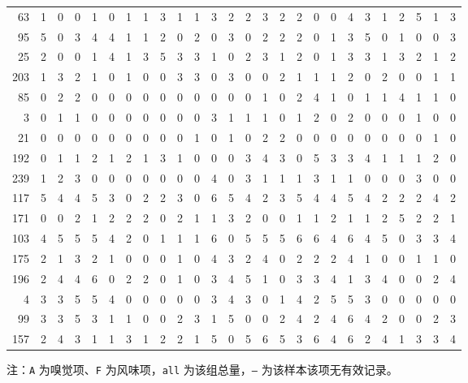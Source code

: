 \begin{longtable}{@{\extracolsep{\fill}}rccccccccccccccccccccccccc@{}}
63 & 1 & 0 & 0 & 1 & 0 & 1 & 1 & 3 & 1 & 1 & 3 & 2 & 2 & 3 & 2 & 2 & 0 & 0 & 4 & 3 & 1 & 2 & 5 & 1 & 3 \\
95 & 5 & 0 & 3 & 4 & 4 & 1 & 1 & 2 & 0 & 2 & 0 & 3 & 0 & 2 & 2 & 2 & 0 & 1 & 3 & 5 & 0 & 1 & 0 & 0 & 3 \\
25 & 2 & 0 & 0 & 1 & 4 & 1 & 3 & 5 & 3 & 3 & 1 & 0 & 2 & 3 & 1 & 2 & 0 & 1 & 3 & 3 & 1 & 3 & 2 & 1 & 2 \\
203 & 1 & 3 & 2 & 1 & 0 & 1 & 0 & 0 & 3 & 3 & 0 & 3 & 0 & 0 & 2 & 1 & 1 & 1 & 2 & 0 & 2 & 0 & 0 & 1 & 1 \\
85 & 0 & 2 & 2 & 0 & 0 & 0 & 0 & 0 & 0 & 0 & 0 & 0 & 0 & 1 & 0 & 2 & 4 & 1 & 0 & 1 & 1 & 4 & 1 & 1 & 0 \\
3 & 0 & 1 & 1 & 0 & 0 & 0 & 0 & 0 & 0 & 0 & 3 & 1 & 1 & 1 & 0 & 1 & 2 & 0 & 2 & 0 & 0 & 0 & 1 & 0 & 0 \\
21 & 0 & 0 & 0 & 0 & 0 & 0 & 0 & 0 & 0 & 1 & 0 & 1 & 0 & 2 & 2 & 0 & 0 & 0 & 0 & 0 & 0 & 0 & 0 & 1 & 0 \\
192 & 0 & 1 & 1 & 2 & 1 & 2 & 1 & 3 & 1 & 0 & 0 & 0 & 3 & 4 & 3 & 0 & 5 & 3 & 3 & 4 & 1 & 1 & 1 & 2 & 0 \\
239 & 1 & 2 & 3 & 0 & 0 & 0 & 0 & 0 & 0 & 0 & 4 & 0 & 3 & 1 & 1 & 1 & 3 & 1 & 1 & 0 & 0 & 0 & 3 & 0 & 0 \\
117 & 5 & 4 & 4 & 5 & 3 & 0 & 2 & 2 & 3 & 0 & 6 & 5 & 4 & 2 & 3 & 5 & 4 & 4 & 5 & 4 & 2 & 2 & 2 & 4 & 2 \\
171 & 0 & 0 & 2 & 1 & 2 & 2 & 2 & 0 & 2 & 1 & 1 & 3 & 2 & 0 & 0 & 1 & 1 & 2 & 1 & 1 & 2 & 5 & 2 & 2 & 1 \\
103 & 4 & 5 & 5 & 5 & 4 & 2 & 0 & 1 & 1 & 1 & 6 & 0 & 5 & 5 & 5 & 6 & 6 & 4 & 6 & 4 & 5 & 0 & 3 & 3 & 4 \\
175 & 2 & 1 & 3 & 2 & 1 & 0 & 0 & 0 & 1 & 0 & 4 & 3 & 2 & 4 & 0 & 2 & 2 & 2 & 4 & 1 & 0 & 0 & 1 & 1 & 0 \\
196 & 2 & 4 & 4 & 6 & 0 & 2 & 2 & 0 & 1 & 0 & 3 & 4 & 5 & 1 & 0 & 3 & 3 & 4 & 1 & 3 & 4 & 0 & 0 & 2 & 4 \\
4 & 3 & 3 & 5 & 5 & 4 & 0 & 0 & 0 & 0 & 0 & 3 & 4 & 3 & 0 & 1 & 4 & 2 & 5 & 5 & 3 & 0 & 0 & 0 & 0 & 0 \\
99 & 3 & 3 & 5 & 3 & 1 & 1 & 0 & 0 & 2 & 3 & 1 & 5 & 0 & 0 & 2 & 4 & 2 & 4 & 6 & 4 & 2 & 0 & 0 & 2 & 3 \\
157 & 2 & 4 & 3 & 1 & 1 & 3 & 1 & 2 & 2 & 1 & 5 & 0 & 5 & 6 & 5 & 3 & 6 & 4 & 6 & 2 & 4 & 1 & 3 & 3 & 4 \\
\end{longtable}
\endgroup

\vspace{-0.5em}
\noindent\footnotesize 注：\texttt{A} 为嗅觉项、\texttt{F} 为风味项，\texttt{all} 为该组总量，\texttt{--} 为该样本该项无有效记录。\par

